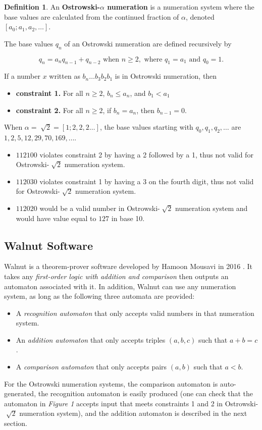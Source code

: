 \documentclass[a4paper]{article}
\theoremstyle{definition}
\newtheorem{definition}{Definition}[section]
\theoremstyle{remark}
\theoremstyle{remark}
\theoremstyle{plain}
\begin{document}
\begin{definition}
An \textbf{Ostrowski-$\alpha$ numeration} is a numeration system where the base values are calculated from the continued fraction of $\alpha$, denoted $[a_0; a_{1},a_{2}, \ldots]$.

The base values $q_{n}$ of an Ostrowski numeration are defined recursively by{

$$q_{n}=a_{n}q_{n-1}+q_{n-2} \text{ when } n \ge 2, \text{ where } q_{1}=a_1 \text{ and } q_{0}=1.$$}
If a number $x$ written as $b_n\dots b_3b_2b_1$ is in Ostrowski numeration, then
\begin{itemize}
\item \textbf{constraint 1.} For all $n\ge 2$, $b_n\le a_n$, and $b_1 < a_1$
\item \textbf{constraint 2.} For all $n\ge 2$, if $b_{n} = a_{n}$, then $b_{n-1} = 0$.
\end{itemize}
\end{definition}

When $\alpha = \sqrt[~]{2} = [1;2,2,2\dots]$, the base values starting with $q_0, q_1, q_2, \dots$ are $1, 2, 5, 12, 29, 70, 169, \dots$.\\
\begin{itemize}
\item $112100$ violates constraint 2 by having a 2 followed by a 1, thus not valid for Ostrowski-$\sqrt[~]{2}$ numeration system.
\item $112030$ violates constraint 1 by having a 3 on the fourth digit, thus not valid for Ostrowski-$\sqrt[~]{2}$ numeration system.
\item $112020$ would be a valid number in Ostrowski-$\sqrt[~]{2}$ numeration system and would have value equal to $127$ in base 10.\\
\end{itemize}


\subsection{Walnut Software}


Walnut is a theorem-prover software developed by Hamoon Mousavi in 2016 \cite{walnut}. It takes any \emph{first-order logic with addition and comparison} then outputs an automaton associated with it. In addition, Walnut can use any numeration system, as long as the following three automata are provided:
\begin{itemize}
\item A \emph{recognition automaton} that only accepts valid numbers in that numeration system.
\item An \emph{addition automaton} that only accepts triples $(a,b,c)$ such that $a+b=c$.
\item A \emph{comparison automaton} that only accepts pairs $(a,b)$ such that $a<b$.
\end{itemize}
For the Ostrowski numeration systems, the comparison automaton is auto-generated, the recognition automaton is easily produced (one can check that the automaton in \emph{Figure 1} accepts input that meets constraints 1 and 2 in Ostrowski-$\sqrt[~]{2}$ numeration system), and the addition automaton is described in the next section.
\end{document}
